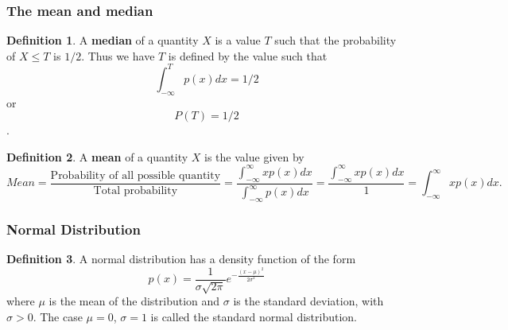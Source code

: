 \documentclass[12pt]{article}
\theoremstyle{definition}
\theoremstyle{definition}
\newtheorem{definition}{Definition}[section]
\theoremstyle{remark}
\theoremstyle{definition}
\theoremstyle{definition}
\theoremstyle{definition}
\begin{document}
\subsubsection*{The mean and median}
\begin{definition}
A \textbf{median} of a quantity $X$ is a value $T$ such that the probability of $X\leq T$ is $1/2$. Thus we have  $T$ is defined by the value such that
\[ \int_{-\infty}^T p(x) dx=1/2 \] or \[P(T)=1/2\].
\end{definition}
\begin{definition} A \textbf{mean} of a quantity $X$ is the value given by
	\[ Mean= \frac{\text{Probability of all possible quantity}}{\text{Total probability}}= \frac{\int_{-\infty}^{\infty}xp(x)dx}{\int_{-\infty}^{\infty}p(x)dx}=\frac{\int_{-\infty}^{\infty}xp(x)dx}{1}=\int_{-\infty}^{\infty}xp(x)dx. \]
\end{definition}

\subsubsection*{Normal Distribution}
\begin{definition}
A normal distribution has a density function of the form 
\[p(x)=\frac{1}{\sigma \sqrt{2 \pi}}e^{-\frac{(x-\mu)^2}{2\sigma^2}}\] where $\mu$ is the mean of the distribution and $\sigma$ is the standard deviation, with $\sigma > 0$.
The case $\mu = 0$, $\sigma = 1$ is called the standard normal distribution.

\end{definition}
\end{document}
